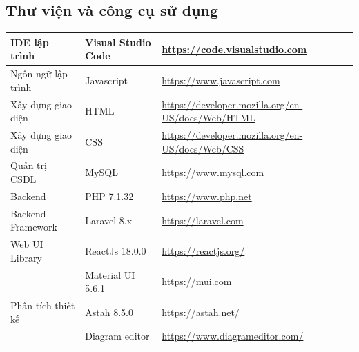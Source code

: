 \documentclass[../DoAn.tex]{subfiles}
\begin{document}
\subsection{Thư viện và công cụ sử dụng}
    \tabletail{\hline}
    \label{bang49}
    \begin{supertabular}{| p{.25\textwidth} | p{.25\textwidth} | p{.40\textwidth} |} 
    \hline
        IDE lập trình& Visual Studio Code& \href{https://code.visualstudio.com}{https://code.visualstudio.com} \\\hline
        Ngôn ngữ lập trình& Javascript& \href{https://www.javascript.com}{https://www.javascript.com} \\\hline
        Xây dựng giao diện& HTML& \href{https://developer.mozilla.org/en-US/docs/Web/HTML}{https://developer.mozilla.org/en-US/docs/Web/HTML} \\\hline
        Xây dựng giao diện& CSS& \href{https://developer.mozilla.org/en-US/docs/Web/CSS}{https://developer.mozilla.org/en-US/docs/Web/CSS} \\\hline
        Quản trị CSDL& MySQL& \href{https://www.mysql.com}{https://www.mysql.com} \\\hline
        Backend& PHP 7.1.32& \href{https://www.php.net}{https://www.php.net}\\\hline
        Backend Framework& Laravel 8.x& \href{https://laravel.com}{https://laravel.com} \\\hline
        Web UI Library& ReactJs 18.0.0& \href{https://reactjs.org/}{https://reactjs.org/}\\
                      & Material UI 5.6.1&\href{https://mui.com}{https://mui.com} \\\hline
        Phân tích thiết kế& Astah 8.5.0 & \href{https://astah.net/}{https://astah.net/} \\
                          & Diagram editor& \href{https://www.diagrameditor.com/}{https://www.diagrameditor.com/} \\\hline
    \end{supertabular}
\end{document}
